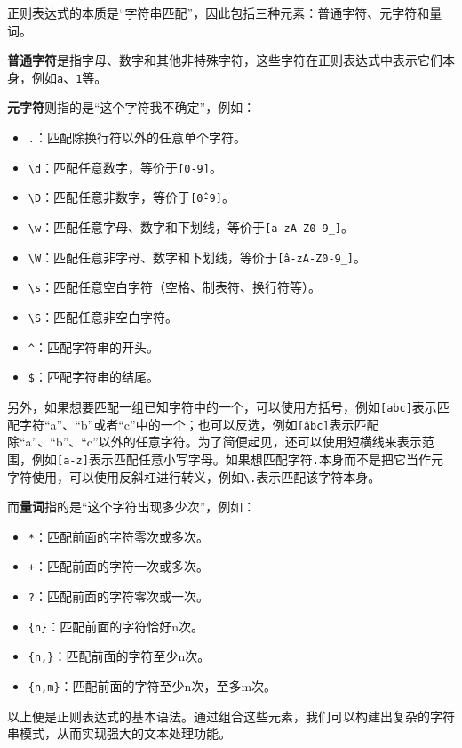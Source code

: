 正则表达式的本质是“字符串匹配”，因此包括三种元素：普通字符、元字符和量词。

\textbf{普通字符}是指字母、数字和其他非特殊字符，这些字符在正则表达式中表示它们本身，例如\texttt{a}、\texttt{1}等。

\textbf{元字符}则指的是“这个字符我不确定”，例如：
\begin{itemize}
  \item \texttt{.}：匹配除换行符以外的任意单个字符。
  \item \texttt{\textbackslash d}：匹配任意数字，等价于\texttt{[0-9]}。
  \item \texttt{\textbackslash D}：匹配任意非数字，等价于\texttt{[\^0-9]}。
  \item \texttt{\textbackslash w}：匹配任意字母、数字和下划线，等价于\texttt{[a-zA-Z0-9\_]}。
  \item \texttt{\textbackslash W}：匹配任意非字母、数字和下划线，等价于\texttt{[\^a-zA-Z0-9\_]}。
  \item \texttt{\textbackslash s}：匹配任意空白字符（空格、制表符、换行符等）。
  \item \texttt{\textbackslash S}：匹配任意非空白字符。
  \item \texttt{\^}：匹配字符串的开头。
  \item \texttt{\$}：匹配字符串的结尾。
\end{itemize}
另外，如果想要匹配一组已知字符中的一个，可以使用方括号，例如\texttt{[abc]}表示匹配字符“a”、“b”或者“c”中的一个；也可以反选，例如\texttt{[\^abc]}表示匹配除“a”、“b”、“c”以外的任意字符。为了简便起见，还可以使用短横线来表示范围，例如\texttt{[a-z]}表示匹配任意小写字母。如果想匹配字符\texttt{.}本身而不是把它当作元字符使用，可以使用反斜杠进行转义，例如\texttt{\textbackslash .}表示匹配该字符本身。

而\textbf{量词}指的是“这个字符出现多少次”，例如：
\begin{itemize}
  \item \texttt{*}：匹配前面的字符零次或多次。
  \item \texttt{+}：匹配前面的字符一次或多次。
  \item \texttt{?}：匹配前面的字符零次或一次。
  \item \texttt{\{n\}}：匹配前面的字符恰好n次。
  \item \texttt{\{n,\}}：匹配前面的字符至少n次。
  \item \texttt{\{n,m\}}：匹配前面的字符至少n次，至多m次。
\end{itemize}

以上便是正则表达式的基本语法。通过组合这些元素，我们可以构建出复杂的字符串模式，从而实现强大的文本处理功能。

